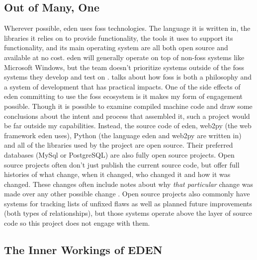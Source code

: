 \documentclass[a4paper,man,natbib]{apa6}
\begin{document}
   \subsection*{Out of Many, One}
   Wherever possible, \acrshort{eden} uses \acrshort{foss} technologies. The language it is written in, the libraries it relies on to provide functionality, the tools it uses to support its functionality, and its main operating system are all both open source and available at no cost. \acrshort{eden} will generally operate on top of non-\acrshort{foss} systems like Microsoft Windows, but the team doesn't prioritize systems outside of the \acrshort{foss} systems they develop and test on \citep{Sahana_Foundation2015-zs}. \citet{Kelty2008-jm} talks about how \acrshort{foss} is both a philosophy and a system of development that has practical impacts. One of the side effects of \acrshort{eden} committing to use the \acrshort{foss} ecosystem is it makes my form of engagement possible. Though it is possible to examine compiled machine code and draw some conclusions about the intent and process that assembled it, such a project would be far outside my capabilities. Instead, the source code of \acrshort{eden}, web2py (the \gls{web framework} \acrshort{eden} uses), Python (the language \acrshort{eden} and web2py are written in) and all of the libraries used by the project are open source. Their preferred databases (MySql or PostgreSQL) are also fully open source projects. Open source projects often don't just publish the current source code, but offer full histories of what change, when it changed, who changed it and how it was changed. These changes often include notes about why \textit{that particular} change was made over any other possible change \citep[p. 13-16]{Chacon2014-im}. Open source projects also commonly have systems for tracking lists of unfixed flaws as well as planned future improvements (both types of \citet{Mackenzie2006-hb} relationships), but those systems operate above the layer of source code so this project does not engage with them.

  \subsection*{The Inner Workings of EDEN}
  


   
  
   \printnoidxglossaries
   \setlength{\parindent}{4em}
   
\end{document}
